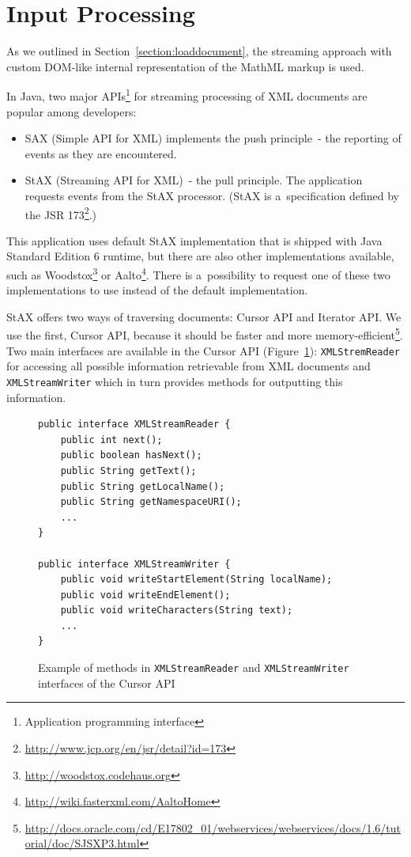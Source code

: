 \documentclass[11pt,oneside,final]{fithesis2}
\begin{document}
\section{Input Processing}
As we outlined in Section~\ref{section:loaddocument}, the streaming approach with custom DOM-like internal representation of the MathML markup is used. 

In Java, two major APIs\footnote{Application programming interface} for streaming processing of XML documents are popular among developers:
\begin{itemize}
\item SAX (Simple API for XML) implements the push principle~- the reporting of events as they are encountered.
\item StAX (Streaming API for XML)~- the pull principle. The application requests events from the StAX processor. (StAX is a~specification defined by the JSR 173\footnote{\url{http://www.jcp.org/en/jsr/detail?id=173}}.)
\end{itemize}

This application uses default StAX implementation that is shipped with Java Standard Edition 6 runtime, but there are also other implementations available, such as Woodstox\footnote{\url{http://woodstox.codehaus.org}} or Aalto\footnote{\url{http://wiki.fasterxml.com/AaltoHome}}. There is a~possibility to request one of these two implementations to use instead of the default implementation.

StAX offers two ways of traversing documents: Cursor API and Iterator API. We use the first, Cursor API, because it should be faster and more memory-efficient\footnote{\url{http://docs.oracle.com/cd/E17802_01/webservices/webservices/docs/1.6/tutorial/doc/SJSXP3.html}}. Two main interfaces are available in the Cursor API (Figure~\ref{fig:staxcursorapi}): \texttt{XMLStremReader} for accessing all possible information retrievable from XML documents and \texttt{XMLStreamWriter} which in turn provides methods for outputting this information. 

\begin{figure}[!ht]
\begin{lstlisting}
public interface XMLStreamReader {
	public int next();
   	public boolean hasNext();
   	public String getText();		
  	public String getLocalName();
  	public String getNamespaceURI();
  	...
} 

public interface XMLStreamWriter {
  	public void writeStartElement(String localName);
  	public void writeEndElement();
 	public void writeCharacters(String text);
	... 
}
\end{lstlisting}
\caption{Example of methods in \texttt{XMLStreamReader} and \texttt{XMLStreamWriter} interfaces of the Cursor API}
\label{fig:staxcursorapi}
\end{figure}
\end{document}
